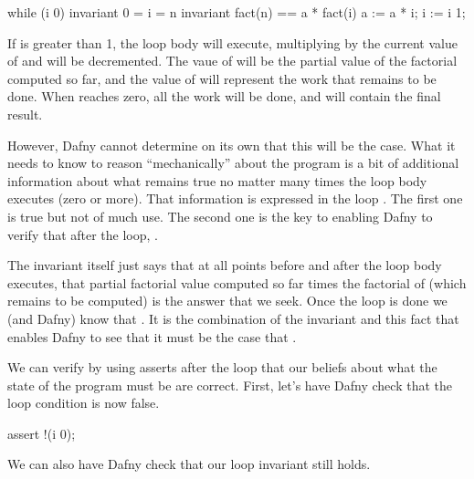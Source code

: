 \documentclass[letterpaper,10pt,english]{sphinxmanual}
\begin{document}
\begin{sphinxVerbatim}[commandchars=\\\{\}]
while (i \PYGZgt{}  0)
    invariant 0 \PYGZlt{}= i \PYGZlt{}= n
    invariant fact(n) == a * fact(i)
\PYGZob{}
    a := a * i;
    i := i \PYGZhy{} 1;
\PYGZcb{}
\end{sphinxVerbatim}

If  is greater than 1, the loop body will execute, multiplying 
by the current value of  and  will be decremented. The vaue of
 will be the partial value of the factorial computed so far, and
the value of  will represent the work that remains to be done. When
 reaches zero, all the work will be done, and  will contain the
final result.

However, Dafny cannot determine on its own that this will be the case.
What it needs to know to reason “mechanically” about the program is a
bit of additional information about what remains true no matter 
many times the loop body executes (zero or more). That information is
expressed in the loop . The first one is true but not of
much use. The second one is the key to enabling Dafny to verify that
after the loop, .

The invariant itself just says that at all points before and after the
loop body executes, that partial factorial value computed so far times
the factorial of  (which remains to be computed) is the answer that
we seek. Once the loop is done we (and Dafny)  know that .
It is the combination of the invariant and this fact that enables Dafny
to see that it must be the case that .

We can verify by using asserts after the loop that our beliefs about
what the state of the program must be are correct. First, let’s have
Dafny check that the loop condition is now false.

\begin{sphinxVerbatim}[commandchars=\\\{\}]
assert !(i \PYGZgt{} 0);
\end{sphinxVerbatim}

We can also have Dafny check that our loop invariant still holds.
\end{document}
